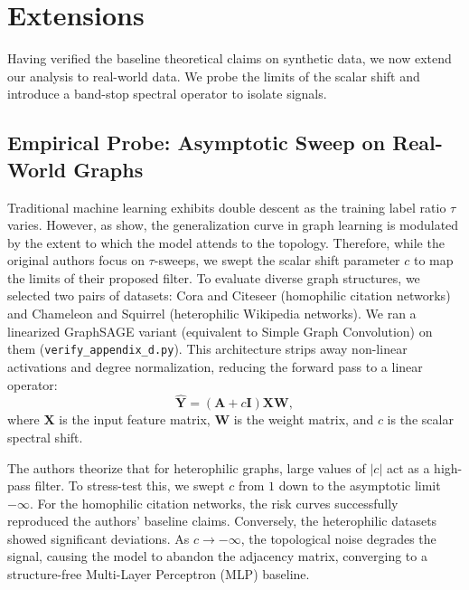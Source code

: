 \documentclass[10pt]{article}
\begin{document}
\section{Extensions}

Having verified the baseline theoretical claims on synthetic data, we now extend our analysis to real-world data.
We probe the limits of the scalar shift and introduce a band-stop spectral operator to isolate signals.

\subsection{Empirical Probe: Asymptotic Sweep on Real-World Graphs}

Traditional machine learning exhibits double descent as the training label ratio $\tau$ varies.
However, as \textcite{shi2024} show, the generalization curve in graph learning is modulated by the extent to which the model attends to the topology.
Therefore, while the original authors focus on $\tau$-sweeps, we swept the scalar shift parameter $c$ to map the limits of their proposed filter.
To evaluate diverse graph structures, we selected two pairs of datasets: Cora and Citeseer (homophilic citation networks) and Chameleon and Squirrel (heterophilic Wikipedia networks).
We ran a linearized GraphSAGE variant (equivalent to Simple Graph Convolution) on them (\texttt{verify\_appendix\_d.py}).
This architecture strips away non-linear activations and degree normalization, reducing the forward pass to a linear operator:
\begin{equation}
    \hat{\mathbf{Y}} = (\mathbf{A} + c\mathbf{I})\mathbf{X}\mathbf{W},
\end{equation}
where $\mathbf{X}$ is the input feature matrix, $\mathbf{W}$ is the weight matrix, and $c$ is the scalar spectral shift. 

The authors theorize that for heterophilic graphs, large values of $|c|$ act as a high-pass filter.
To stress-test this, we swept $c$ from $1$ down to the asymptotic limit $-\infty$.
For the homophilic citation networks, the risk curves successfully reproduced the authors' baseline claims.
Conversely, the heterophilic datasets showed significant deviations.
As $c \to -\infty$, the topological noise degrades the signal, causing the model to abandon the adjacency matrix, converging to a structure-free Multi-Layer Perceptron (MLP) baseline.
\end{document}
